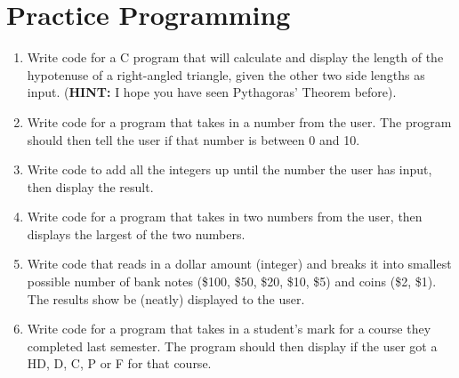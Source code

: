 \documentclass{pass}
\begin{document}
\section*{Practice Programming}
\begin{enumerate}[resume]
\item Write code for a C program that will calculate and display the length of the hypotenuse of a right-angled triangle, given the other two side lengths as input. (\textbf{HINT:} I hope you have seen Pythagoras' Theorem before). \\

\item Write code for a program that takes in a number from the user. The program should then tell the user if that number is between 0 and 10. \\

\item Write code to add all the integers up until the number the user has input, then display the result. \\

\item Write code for a program that takes in two numbers from the user, then displays the largest of the two numbers. \\

\item Write code that reads in a dollar amount (integer) and breaks it into smallest possible number of bank notes (\$100, \$50, \$20, \$10, \$5) and coins (\$2, \$1). The results show be (neatly) displayed to the user. \\

\item Write code for a program that takes in a student’s mark for a course they completed last semester. The program should then display if the user got a HD, D, C, P or F for that course. \\



\end{enumerate}
\end{document}
